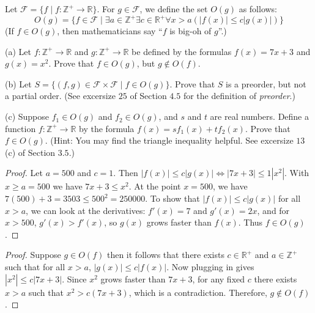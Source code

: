 \begin{tcolorbox}[title=Problem 19, breakable]
    Let $\mathcal{F} = \{f \mid f : \mathbb{Z}^+ \rightarrow \mathbb{R}\}$.
    For $g \in \mathcal{F}$, we define the set $O(g)$ as follows:
    \[O(g) = \{f \in \mathcal{F} \mid \exists{a} \in \mathbb{Z}^+
                \exists{c} \in \mathbb{R}^+ \forall{x} > a (|f(x)| \le c|g(x)|)\}\]
    (If $f \in O(g)$, then mathematicians say ``$f$ is big-oh of $g$''.)

    (a) Let $f : \mathbb{Z}^+ \rightarrow \mathbb{R}$ and $g : \mathbb{Z}^+ \rightarrow \mathbb{R}$
        be defined by the formulas $f(x) = 7x + 3$ and $g(x) = x^2$. 
        Prove that $f \in O(g)$, but $g \notin O(f)$.

    (b) Let $S = \{(f, g) \in \mathcal{F} \times \mathcal{F} \mid f \in O(g)\}$. Prove that 
        $S$ is a preorder, but not a partial order. (See excersize $25$  of Section $4.5$
        for the definition of \emph{preorder}.)

    (c) Suppose $f_1 \in O(g)$ and $f_2 \in O(g)$, and $s$ and $t$ are real numbers.
        Define a function $f : \mathbb{Z}^+ \rightarrow \mathbb{R}$ by the formula 
        $f(x) = sf_1(x) + tf_2(x)$. Prove that $f \in O(g)$.
        (Hint: You may find the triangle inequality helpful. See excersize $13$(c)
         of Section $3.5$.)
\end{tcolorbox}

\begin{proof}
    Let $a = 500$ and $c = 1$.
    Then $|f(x)| \le c|g(x)| \iff |7x + 3| \le 1|x^2|$.
    With $x \ge a = 500$ we have $7x + 3 \le x^2$.
    At the point $x = 500$, we have $7(500) + 3 = 3503 \le 500^2 = 250000$.
    To show that $|f(x)| \le c|g(x)|$ for all $x > a$, we can look at the derivatives:
        $f'(x) = 7$ and $g'(x) = 2x$, and for $x > 500$, $g'(x) > f'(x)$, so $g(x)$ grows faster than $f(x)$.
    Thus $f \in O(g)$.
\end{proof}

\begin{proof}
    Suppose $g \in O(f)$ then it follows that 
        there exists $c \in \mathbb{R}^+$ and $a \in \mathbb{Z}^+$
        such that for all $x > a$, $|g(x)| \le c|f(x)|$.
    Now plugging in gives $|x^2| \le c|7x + 3|$.
    Since $x^2$ grows faster than $7x + 3$, for any fixed $c$
        there exists $x > a$ such that $x^2 > c(7x + 3)$,
        which is a contradiction.
    Therefore, $g \notin O(f)$.
\end{proof}

